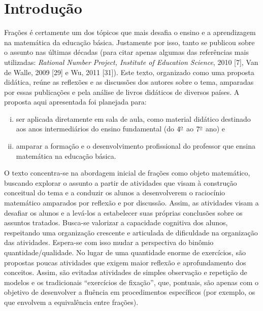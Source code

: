 
%
%
% 

\setcounter{chapter}{-1}
\chapter{Introdução}


Frações é certamente um dos tópicos que mais desafia o ensino e a aprendizagem na matemática da educação básica. Justamente por isso, tanto se publicou sobre o assunto nas últimas décadas (para citar apenas algumas das referências mais utilizadas:  {\it Rational Number Project, Institute of Education Science}, 2010 [7], Van de Walle, 2009 [29] e Wu, 2011 [31]). Este texto, organizado como uma proposta didática,  reúne as reflexões e as discussões dos autores sobre o tema, amparadas por essas publicações e pela análise de livros didáticos de diversos países. A proposta aqui apresentada foi planejada para:

\begin{enumerate}[(i)]
\item  ser aplicada diretamente em sala de aula, como material didático destinado aos anos intermediários do ensino fundamental (do $4^{\textrm{\underline{o}}}$ ao $7^{\textrm{\underline{o}}}$ ano) e
\item amparar a formação e o desenvolvimento profissional do professor que ensina matemática na educação básica.
\end{enumerate}

O texto concentra-se na abordagem inicial de frações como objeto matemático, buscando explorar o assunto a partir de atividades que visam à construção conceitual do tema e a conduzir os alunos a desenvolverem o raciocínio matemático amparados por reflexão e por discussão. Assim, as atividades visam a desafiar os alunos e a levá-los a estabelecer suas próprias conclusões sobre os assuntos tratados. Busca-se valorizar a capacidade cognitiva dos alunos, respeitando uma organização crescente e articulada de diﬁculdade na organização das atividades. Espera-se com isso mudar a perspectiva do binômio quantidade/qualidade. No lugar de uma quantidade enorme de exercícios, são propostas poucas  atividades que exigem maior reflexão e aprofundamento dos conceitos. Assim, são evitadas atividades de simples observação e repetição de modelos e os tradicionais ``exercícios de fixação'', que, pontuais, são apenas com o objetivo de desenvolver a fluência em procedimentos específicos (por exemplo, os que envolvem a equivalência entre frações).

